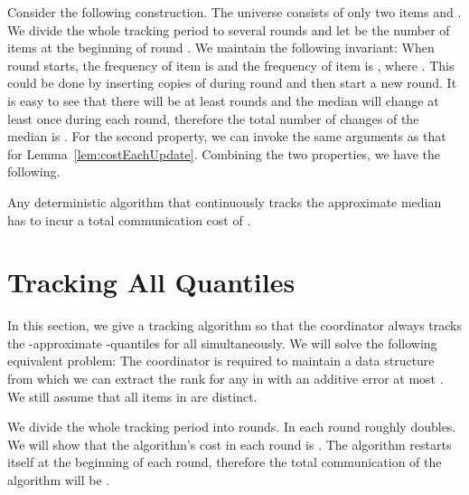 \documentclass[10pt]{article}
\begin{document}
Consider the following construction. The universe consists of only
two items  and . We divide the whole tracking period to
several rounds and let  be the number of items at the
beginning of round . We maintain the following invariant: When
round  starts, the frequency of item  is  and the frequency of item  is , where . This could be done by inserting
 copies of  during round 
and then start a new round. It is easy to see that there will be
at least  rounds and the median will change
at least once during each round, therefore the total number of
changes of the median is . For the second
property, we can invoke the same arguments as that for
Lemma~\ref{lem:costEachUpdate}.
Combining the two properties, we have the following.

\begin{theorem}
\label{thm:lowerbound-median}
  Any deterministic algorithm that continuously tracks the approximate
  median has to incur a total communication cost of
  .
\end{theorem}




 
\newcommand{\T}{\mathcal{T}}
\newcommand{\hmax}{h}

\section{Tracking All Quantiles}
\label{sec:tracking-quantiles}

In this section, we give a tracking algorithm so that the
coordinator  always tracks the -approximate
-quantiles for all  simultaneously.  We will solve
the
following equivalent problem: The coordinator is required to
maintain a data structure from which we can extract the rank
 for any  in  with an additive error at most
. We still assume that all items in  are distinct.

We divide the whole tracking period into  rounds.  In each round
 roughly doubles. We will show that the algorithm's cost in each round
is .  The algorithm restarts itself
at the beginning of each round, therefore the total communication of the
algorithm will be .
\end{document}
